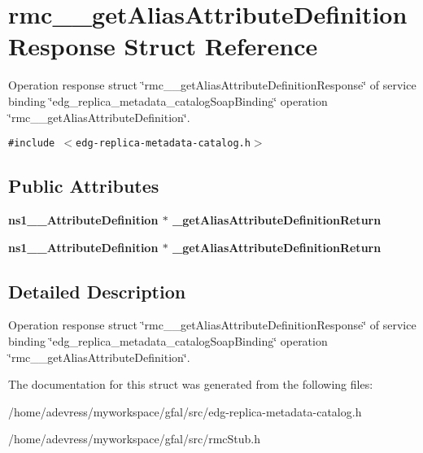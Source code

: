 \section{rmc\_\-\_\-get\-Alias\-Attribute\-Definition\-Response Struct Reference}
\label{structrmc____getAliasAttributeDefinitionResponse}
Operation response struct \char`\"{}rmc\_\-\_\-get\-Alias\-Attribute\-Definition\-Response\char`\"{} of service binding \char`\"{}edg\_\-replica\_\-metadata\_\-catalog\-Soap\-Binding\char`\"{} operation \char`\"{}rmc\_\-\_\-get\-Alias\-Attribute\-Definition\char`\"{}.  


{\tt \#include $<$edg-replica-metadata-catalog.h$>$}

\subsection*{Public Attributes}
\begin{CompactItemize}
\item 
\bf{ns1\_\-\_\-Attribute\-Definition} $\ast$ \textbf{\_\-get\-Alias\-Attribute\-Definition\-Return}\label{structrmc____getAliasAttributeDefinitionResponse_90e05efc2b5d6866a36ea28431d125d0}

\item 
\bf{ns1\_\-\_\-Attribute\-Definition} $\ast$ \textbf{\_\-get\-Alias\-Attribute\-Definition\-Return}\label{structrmc____getAliasAttributeDefinitionResponse_90e05efc2b5d6866a36ea28431d125d0}

\end{CompactItemize}


\subsection{Detailed Description}
Operation response struct \char`\"{}rmc\_\-\_\-get\-Alias\-Attribute\-Definition\-Response\char`\"{} of service binding \char`\"{}edg\_\-replica\_\-metadata\_\-catalog\-Soap\-Binding\char`\"{} operation \char`\"{}rmc\_\-\_\-get\-Alias\-Attribute\-Definition\char`\"{}. 



The documentation for this struct was generated from the following files:\begin{CompactItemize}
\item 
/home/adevress/myworkspace/gfal/src/edg-replica-metadata-catalog.h\item 
/home/adevress/myworkspace/gfal/src/rmc\-Stub.h\end{CompactItemize}
